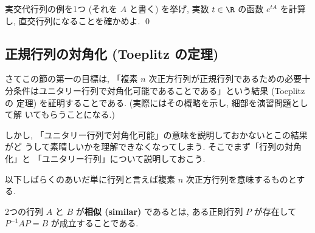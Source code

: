 \documentclass[12pt,twoside]{jarticle}
\begin{document}
\begin{question}[5点]
  実交代行列の例を1つ (それを $A$ と書く) を挙げ, 
  実数 $t\in\R$ の函数 $e^{tA}$ を計算し, 直交行列になることを確かめよ.
  \qed
\end{question}


\subsection{正規行列の対角化 (Toeplitz の定理)}


さてこの節の第一の目標は, 「複素 $n$ 次正方行列が正規行列であるための必要十
分条件はユニタリー行列で対角化可能であることである」という結果 (Toeplitz の
定理) を証明することである.  (実際にはその概略を示し, 細部を演習問題として解
いてもらうことになる.)

しかし, 「ユニタリー行列で対角化可能」の意味を説明しておかないとこの結果がど
うして素晴しいかを理解できなくなってしまう.  そこでまず「行列の対角化」と
「ユニタリー行列」について説明しておこう.

以下しばらくのあいだ単に行列と言えば複素 $n$ 次正方行列を意味するものとする.

2つの行列 $A$ と $B$ が{\bf 相似 (similar)} であるとは, 
ある正則行列 $P$ が存在して $P^{-1}AP = B$ が成立することである.
\end{document}
